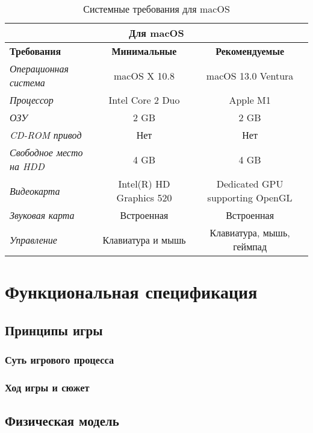 \documentclass{article}
\begin{document}
	\begin{table}[h!]
		\centering
		\renewcommand{\arraystretch}{1.5}
		\setlength{\tabcolsep}{8pt}
		\begin{tabular}{|l|c|c|}
			\hline
			\multicolumn{3}{|c|}{\textbf{Для macOS}} \\ \hline
			\textbf{Требования} & \textbf{Минимальные} & \textbf{Рекомендуемые} \\ \hline
			\textit{Операционная система} & macOS X 10.8 & macOS 13.0 Ventura \\ \hline
			\textit{Процессор} &  Intel Core 2 Duo & Apple M1 \\ \hline
			\textit{ОЗУ} & 2 GB & 2 GB \\ \hline
			\textit{CD-ROM привод} & Нет & Нет \\ \hline
			\textit{Свободное место на HDD} & 4 GB & 4 GB \\ \hline
			\textit{Видеокарта} & Intel(R) HD Graphics 520 & Dedicated GPU supporting OpenGL \\ \hline
			\textit{Звуковая карта} & Встроенная & Встроенная \\ \hline
			\textit{Управление} & Клавиатура и мышь & Клавиатура, мышь, геймпад \\ \hline
		\end{tabular}
		\caption{Системные требования для macOS}
		\label{tab:system-requirements2}
	\end{table}
	
	\newpage
	\section{Функциональная спецификация}
	
	\subsection{Принципы игры}
	
	\subsubsection{Суть игрового процесса}
	
	\subsubsection{Ход игры и сюжет}
	
	\newpage
	\subsection{Физическая модель}
	
\end{document}
